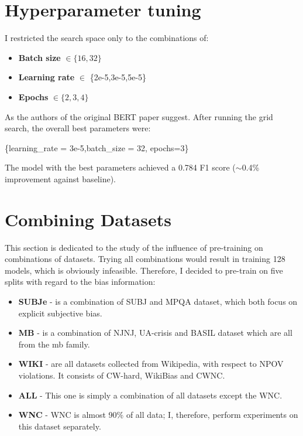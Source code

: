 \newpage

 \section{Hyperparameter tuning}
I restricted the search space only to the combinations of:
 \begin{itemize}
     \item \textbf{Batch size} $\in \{16,32\}$
     \item \textbf{Learning rate} $\in $ \{2e-5,3e-5,5e-5\}
     \item \textbf{Epochs} $\in \{2,3,4\}$
 \end{itemize}
 
 As the authors of the original BERT paper suggest.  After running the grid search, the overall best parameters were:
 \begin{center}
      \{learning\_rate = 3e-5,batch\_size = 32, epochs=3\}
 \end{center}
 
 The model with the best parameters achieved a 0.784 F1 score ($\sim$0.4\% improvement against baseline).


 
 






\section{Combining Datasets}
This section is dedicated to the study of the influence of pre-training on combinations of datasets. Trying all combinations would result in training 128 models, which is obviously infeasible. Therefore, I decided to pre-train on five splits with regard to the bias information:
\begin{itemize}
    \item \textbf{SUBJe} - is a combination of SUBJ and MPQA dataset, which both focus on explicit subjective bias.
    \item \textbf{MB} - is a combination of NJNJ, UA-crisis and BASIL dataset which are all from the \gls{mb} family.
    \item \textbf{WIKI} - are all datasets collected from Wikipedia, with respect to NPOV violations. It consists of CW-hard, WikiBias and CWNC.
    \item \textbf{ALL} - This one is simply a combination of all datasets except the WNC.
    \item \textbf{WNC} - WNC is almost 90\% of all data; I, therefore, perform experiments on this dataset separately.
\end{itemize}
 
